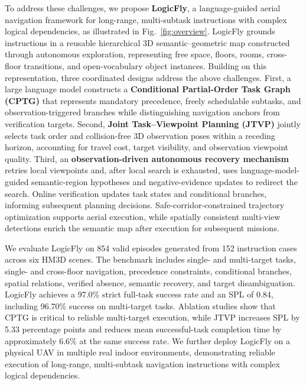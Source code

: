 \documentclass[letterpaper,10pt,journal]{IEEEtran}
\begin{document}
To address these challenges, we propose \textbf{LogicFly}, a language-guided aerial navigation framework for long-range, multi-subtask instructions with complex logical dependencies, as illustrated in Fig.~\ref{fig:overview}. LogicFly grounds instructions in a reusable hierarchical 3D semantic--geometric map constructed through autonomous exploration, representing free space, floors, rooms, cross-floor transitions, and open-vocabulary object instances. Building on this representation, three coordinated designs address the above challenges. First, a large language model constructs a \textbf{Conditional Partial-Order Task Graph (CPTG)} that represents mandatory precedence, freely schedulable subtasks, and observation-triggered branches while distinguishing navigation anchors from verification targets. Second, \textbf{Joint Task--Viewpoint Planning (JTVP)} jointly selects task order and collision-free 3D observation poses within a receding horizon, accounting for travel cost, target visibility, and observation viewpoint quality. Third, an \textbf{observation-driven autonomous recovery mechanism} retries local viewpoints and, after local search is exhausted, uses language-model-guided semantic-region hypotheses and negative-evidence updates to redirect the search. Online verification updates task states and conditional branches, informing subsequent planning decisions. Safe-corridor-constrained trajectory optimization supports aerial execution, while spatially consistent multi-view detections enrich the semantic map after execution for subsequent missions.

We evaluate LogicFly on 854 valid episodes generated from 152 instruction cases across six HM3D scenes. The benchmark includes single- and multi-target tasks, single- and cross-floor navigation, precedence constraints, conditional branches, spatial relations, verified absence, semantic recovery, and target disambiguation. LogicFly achieves a 97.0\% strict full-task success rate and an SPL of 0.84, including 96.70\% success on multi-target tasks. Ablation studies show that CPTG is critical to reliable multi-target execution, while JTVP increases SPL by 5.33 percentage points and reduces mean successful-task completion time by approximately 6.6\% at the same success rate. We further deploy LogicFly on a physical UAV in multiple real indoor environments, demonstrating reliable execution of long-range, multi-subtask navigation instructions with complex logical dependencies.
\end{document}
